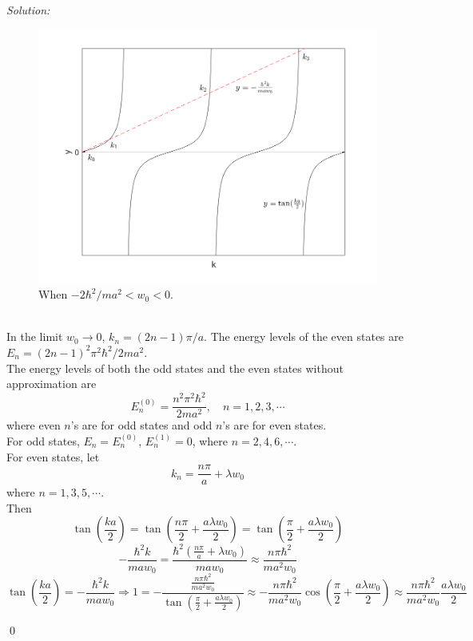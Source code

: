 \documentclass[10pt,a4paper]{article}
\newenvironment{sol}
    {\emph{Solution:}
    }
    {
    \qed
    }
\begin{document}
\begin{sol}
\begin{itemize}
\begin{figure}[h]
\centering
\includegraphics[width=.5\textwidth]{problem_13.png}
\caption{When $-2\hbar^2/ma^2<w_0<0$.}\label{problem_13}
\end{figure}
\\In the limit $w_0\rightarrow0$, $k_n=(2n-1)\pi/a$. The energy levels of the even states are $E_n=(2n-1)^2\pi^2\hbar^2/2ma^2$.\\
The energy levels of both the odd states and the even states without approximation are
\begin{equation}
E_n^{(0)}=\frac{n^2\pi^2\hbar^2}{2ma^2},\quad n=1,2,3,\cdots
\end{equation}
where even $n$'s are for odd states and odd $n$'s are for even states.\\
For odd states, $E_n=E_n^{(0)}$, $E_n^{(1)}=0$, where $n=2,4,6,\cdots$.\\
For even states, let
\begin{equation}
k_n=\frac{n\pi}{a}+\lambda w_0
\end{equation}
where $n=1,3,5,\cdots$.\\
Then
\begin{equation}
\tan\left(\frac{ka}{2}\right)=\tan\left(\frac{n\pi}{2}+\frac{a\lambda w_0}{2}\right)=\tan\left(\frac{\pi}{2}+\frac{a\lambda w_0}{2}\right)
\end{equation}
\begin{equation}
-\frac{\hbar^2k}{maw_0}=\frac{\hbar^2\left(\frac{n\pi}{a}+\lambda w_0\right)}{maw_0}\approx\frac{n\pi\hbar^2}{ma^2w_0}
\end{equation}
\begin{equation}
\tan\left(\frac{ka}{2}\right)=-\frac{\hbar^2k}{maw_0}\Longrightarrow1=-\frac{\frac{n\pi\hbar^2}{ma^2w_0}}{\tan\left(\frac{\pi}{2}+\frac{a\lambda w_0}{2}\right)}\approx-\frac{n\pi\hbar^2}{ma^2w_0}\cos\left(\frac{\pi}{2}+\frac{a\lambda w_0}{2}\right)\approx\frac{n\pi\hbar^2}{ma^2w_0}\frac{a\lambda w_0}{2}
\end{equation}
\begin{equation}

\end{equation}
\end{itemize}
\end{sol}
\end{document}
